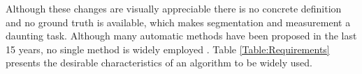 Although these changes are visually appreciable there is no concrete definition and no ground truth is available, which makes segmentation and measurement a daunting task. Although many automatic methods have been proposed in the last 15 years, no single method is widely employed \cite{23084503}. Table \ref{Table:Requirements} presents the desirable characteristics of an algorithm to be widely used.
    
    
    
    